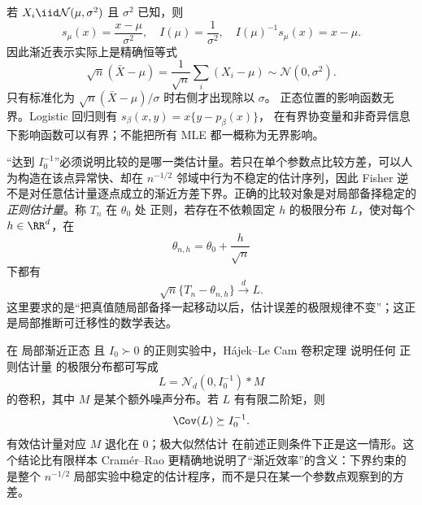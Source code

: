 \begin{workedexample}[正态均值的有效影响函数]
若 $X_i\iid\mathcal N(\mu,\sigma^2)$ 且 $\sigma^2$ 已知，则
\[
 s_\mu(x)=\frac{x-\mu}{\sigma^2},\quad
 I(\mu)=\frac1{\sigma^2},\quad
 I(\mu)^{-1}s_\mu(x)=x-\mu.
\]
因此渐近表示实际上是精确恒等式
\[
 \sqrt n(\bar X-\mu)=\frac1{\sqrt n}\sum_i(X_i-\mu)
 \sim\mathcal N(0,\sigma^2).
\]
只有标准化为 $\sqrt n(\bar X-\mu)/\sigma$ 时右侧才出现除以 $\sigma$。
正态位置的影响函数无界。Logistic 回归则有 $s_\beta(x,y)=x\{y-p_\beta(x)\}$，
在有界协变量和非奇异信息下影响函数可以有界；不能把所有 MLE 都一概称为无界影响。
\end{workedexample}

\begin{definition}[局部正则估计量]
“达到 $I_0^{-1}$”必须说明比较的是哪一类估计量。若只在单个参数点比较方差，可以人为构造在该点异常快、却在 $n^{-1/2}$ 邻域中行为不稳定的估计序列，因此 Fisher 逆 不是对任意估计量逐点成立的渐近方差下界。正确的比较对象是对局部备择稳定的 \emph{正则估计量}。称 $T_n$ 在 $\theta_0$ 处 正则，若存在不依赖固定 $h$ 的极限分布 $L$，使对每个 $h\in\RR^d$，在
\[
 \theta_{n,h}=\theta_0+\frac h{\sqrt n}
\]
下都有
\begin{equation}\label{eq:math-stat-regular-estimator}
 \sqrt n\{T_n-\theta_{n,h}\}\xrightarrow{d} L.
\end{equation}
这里要求的是“把真值随局部备择一起移动以后，估计误差的极限规律不变”；这正是局部推断可迁移性的数学表达。
\end{definition}

\begin{theorem}
在 局部渐近正态 且 $I_0\succ0$ 的正则实验中，H\'ajek--Le Cam 卷积定理 说明任何 正则估计量 的极限分布都可写成
\begin{equation}\label{eq:math-stat-hajek-convolution}
 L
 =\mathcal N_d(0,I_0^{-1})*M
\end{equation}
的卷积，其中 $M$ 是某个额外噪声分布。若 $L$ 有有限二阶矩，则
\[
 \Cov(L)\succeq I_0^{-1}.
\]
有效估计量对应 $M$ 退化在 $0$；极大似然估计 在前述正则条件下正是这一情形。这个结论比有限样本 Cramér--Rao 更精确地说明了“渐近效率”的含义：下界约束的是整个 $n^{-1/2}$ 局部实验中稳定的估计程序，而不是只在某一个参数点观察到的方差。
\end{theorem}

